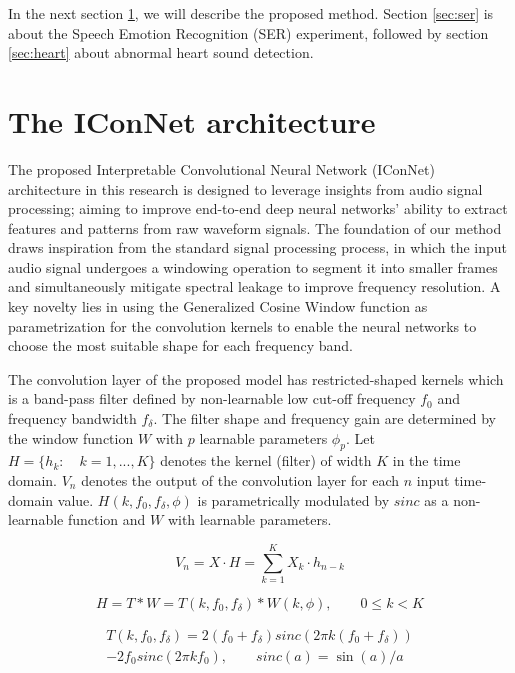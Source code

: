In the next section \ref{sec:method}, we will describe the proposed method. Section \ref{sec:ser} is about the Speech Emotion Recognition (SER) experiment, followed by section \ref{sec:heart} about abnormal heart sound detection.




\section{The IConNet architecture} 
\label{sec:method}

The proposed Interpretable Convolutional Neural Network (IConNet) architecture in this research is designed to leverage insights from audio signal processing; aiming to improve end-to-end deep neural networks' ability to extract features and patterns from raw waveform signals. The foundation of our method draws inspiration from the standard signal processing process, in which the input audio signal undergoes a windowing operation to segment it into smaller frames and simultaneously mitigate spectral leakage to improve frequency resolution. A key novelty lies in using the Generalized Cosine Window function as parametrization for the convolution kernels to enable the neural networks to choose the most suitable shape for each frequency band. 

The convolution layer of the proposed model has restricted-shaped kernels which is a band-pass filter defined by non-learnable low cut-off frequency $f_0$ and frequency bandwidth $f_\delta$. The filter shape and frequency gain are determined by the window function $W$ with $p$ learnable parameters $\phi_p$. Let $H = \{h_k: \quad k=1, ..., K\}$ denotes the kernel (filter) of width $K$ in the time domain. $V_n$ denotes the output of the convolution layer for each $n$ input time-domain value. $H(k, f_0, f_\delta, \phi)$ is parametrically modulated by $sinc$ as a non-learnable function and $W$ with learnable parameters.

\begin{equation}
    V_n = X \cdot H = \sum_{k=1}^{K}X_k\cdot h_{n-k}
\end{equation}

\begin{equation}
    H = T * W = T(k, f_0, f_\delta) * W(k, \phi), \qquad 0 \leq k < K
\end{equation}

\begin{multline}
    T(k, f_0, f_\delta) = \displaystyle{2(f_0+f_\delta){sinc}(2{\pi}k(f_0+f_\delta))} \\ 
\displaystyle{- 2{f_0}{sinc}(2{\pi}k{f_0}), \qquad sinc(a) = \sin(a)/a}
\end{multline}

